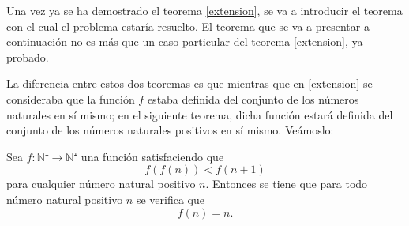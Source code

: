 Una vez ya se ha demostrado el teorema \ref{extension}, se va a
introducir el teorema con el cual el problema estaría resuelto. El
teorema que se va a presentar a continuación no es más que un caso
particular del teorema \ref{extension}, ya probado.

La diferencia entre estos dos teoremas es que mientras que en
\ref{extension} se consideraba que la función \(f\) estaba definida
del conjunto de los números naturales en sí mismo; en el siguiente
teorema, dicha función estará definida del conjunto de los números
naturales positivos en sí mismo. Veámoslo:

\begin{teorema}[imo1977\(\_ \)q6]
  Sea \(f:ℕ⁺ → ℕ⁺\) una función satisfaciendo que
  \begin{equation}
    f(f(n)) < f(n+1)
  \end{equation}
  para cualquier número natural positivo \(n\). Entonces se tiene
  que para todo número natural positivo \(n\) se verifica que
  \begin{equation}\label{objf}
    f(n) = n.
  \end{equation}
\end{teorema}

